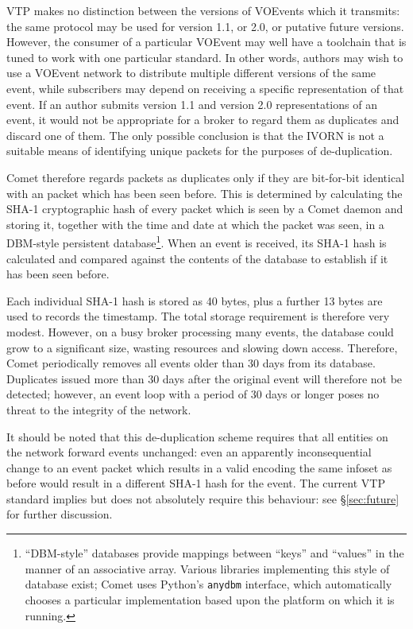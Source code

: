 \documentclass[5p,authoryear]{elsarticle}
\begin{document}
VTP makes no distinction between the versions of VOEvents which it transmits:
the same protocol may be used for version 1.1, or 2.0, or putative future
versions. However, the consumer of a particular VOEvent may well have a
toolchain that is tuned to work with one particular standard. In other words,
authors may wish to use a VOEvent network to distribute multiple different
versions of the same event, while subscribers may depend on receiving a
specific representation of that event. If an author submits version 1.1 and
version 2.0 representations of an event, it would not be appropriate for a
broker to regard them as duplicates and discard one of them. The only possible
conclusion is that the IVORN is not a suitable means of identifying unique
packets for the purposes of de-duplication.

Comet therefore regards packets as duplicates only if they are bit-for-bit
identical with an packet which has been seen before. This is determined by
calculating the SHA-1 \citep{Eastlake:2001} cryptographic hash of every packet
which is seen by a Comet daemon and storing it, together with the time and
date at which the packet was seen, in a DBM-style \citep{DBM:1979} persistent
database\footnote{``DBM-style'' databases provide mappings between ``keys''
and ``values'' in the manner of an associative array. Various libraries
implementing this style of database exist; Comet uses Python's \texttt{anydbm}
interface, which automatically chooses a particular implementation based upon
the platform on which it is running.}. When an event is received, its SHA-1
hash is calculated and compared against the contents of the database to
establish if it has been seen before.

Each individual SHA-1 hash is stored as 40 bytes, plus a further 13 bytes are
used to records the timestamp. The total storage requirement is therefore very
modest. However, on a busy broker processing many events, the database could
grow to a significant size, wasting resources and slowing down access.
Therefore, Comet periodically removes all events older than 30 days from its
database. Duplicates issued more than 30 days after the original event will
therefore not be detected; however, an event loop with a period of 30 days or
longer poses no threat to the integrity of the network.

It should be noted that this de-duplication scheme requires that all entities
on the network forward events unchanged: even an apparently inconsequential
change to an event packet which results in a valid encoding the same infoset
as before would result in a different SHA-1 hash for the event. The current
VTP standard implies but does not absolutely require this behaviour: see
\S\ref{sec:future} for further discussion.
\end{document}
